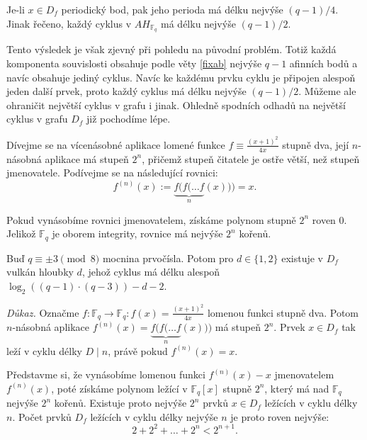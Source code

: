 \documentclass[12pt]{report}
\begin{document}
\begin{dusledek}
Je-li $x \in D_f$ periodický bod, pak jeho perioda má délku nejvýše $(q-1)/4$. Jinak řečeno, každý cyklus v $AH_{\mathbb{F}_q}$ má délku nejvýše $(q-1)/2$.
\end{dusledek}





Tento výsledek je však zjevný při pohledu na původní problém. Totiž každá komponenta souvislosti obsahuje podle věty \ref{fixab} nejvýše $q-1$ afinních bodů a navíc obsahuje jediný cyklus. Navíc ke každému prvku cyklu je připojen alespoň jeden další prvek, proto každý cyklus má délku nejvýše $(q-1)/2$. Můžeme ale ohraničit největší cyklus v grafu i jinak. Ohledně spodních odhadů na největší cyklus v grafu $D_{f}$ již pochodíme lépe.

Dívejme se na vícenásobné aplikace lomené funkce $f \equiv \frac{(x+1)^2}{4x}$ stupně dva, její $n$-násobná aplikace má stupeň $2^n$, přičemž stupeň čitatele je ostře větší, než stupeň jmenovatele. Podívejme se na následující rovnici: $$f^{(n)}(x) := \underbrace{f(f(\dots f}_{n}(x))) = x.$$

Pokud vynásobíme rovnici jmenovatelem, získáme polynom stupně $2^n$ roven $0$. Jelikož $\mathbb{F}_q$ je oborem integrity, rovnice má nejvýše $2^n$ kořenů. 

\begin{veta}
Buď $q \equiv \pm 3 \pmod{8}$ mocnina prvočísla. Potom pro $d \in \lbrace 1,2 \rbrace$ existuje v $D_f$ vulkán hloubky $d$, jehož cyklus má délku alespoň $\log_2((q-1)\cdot(q-3))-d-2$.
\end{veta}
\noindent \textit{Důkaz.} Označme $f: \mathbb{F}_q \longrightarrow \mathbb{F}_q : f(x) = \frac{(x+1)^2}{4x}$ lomenou funkci stupně dva. Potom $n$-násobná aplikace $f^{(n)} (x) = \underbrace{f(f(\dots f}_{n}(x)))$ má stupeň $2^n$. Prvek $x \in D_f$ tak leží v cyklu délky $D \mid n$, právě pokud $f^{(n)}(x)=x$.

Představme si, že vynásobíme lomenou funkci $f^{(n)}(x)-x$ jmenovatelem $f^{(n)}(x)$, poté získáme polynom ležící v $\mathbb{F}_q [x]$ stupně $2^n$, který má nad $\mathbb{F}_q$ nejvýše $2^n$ kořenů. Existuje proto nejvýše $2^n$ prvků $x \in D_f$ ležících v cyklu délky $n$. Počet prvků $D_f$ ležících v cyklu délky nejvýše $n$ je proto roven nejvýše:
\begin{equation}\label{lol}
2+2^2+\dots+2^n < 2^{n+1}.
\end{equation}
\end{document}
